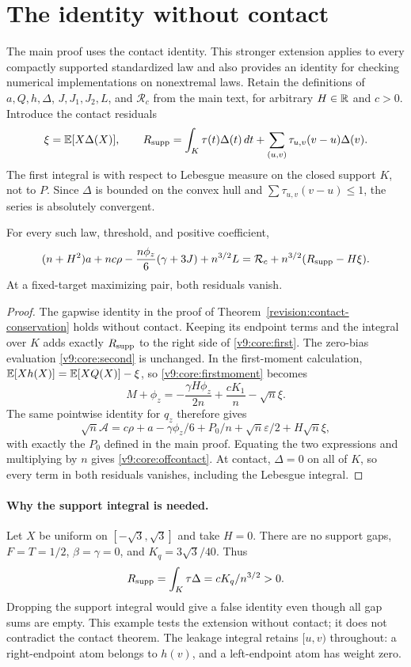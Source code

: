\section{The identity without contact}\label{revision:offcontact}
The main proof uses the contact identity. This stronger extension
applies to every compactly supported standardized law and also provides
an identity for checking numerical implementations on nonextremal laws. Retain the definitions of $a,Q,h,\Delta$,
$J,J_1,J_2,L$, and $\mathcal R_c$ from the main text, for arbitrary
$H\in\mathbb R$ and $c>0$. Introduce the contact residuals
\begin{equation}\label{v9:core:residuals}
 \xi=\mathbb E[X\Delta(X)],\qquad
 R_{\rm supp}=\int_K\tau(t)\Delta(t)\,dt
       +\sum_{(u,v)}\tau_{u,v}(v-u)\Delta(v).
\end{equation}
The first integral is with respect to Lebesgue measure on the closed
support $K$, not to $P$. Since $\Delta$ is bounded on the convex hull
and $\sum\tau_{u,v}(v-u)\le1$, the series is absolutely convergent.

\begin{theorem}\label{v9:core:general}
For every such law, threshold, and positive coefficient,
\begin{equation}\label{v9:core:offcontact}
 (n+H^2)a+nc\rho-\frac{n\phi_z}{6}(\gamma+3J)+n^{3/2}L
 =\mathcal R_c+n^{3/2}(R_{\rm supp}-H\xi).
\end{equation}
At a fixed-target maximizing pair, both residuals vanish.
\end{theorem}
\begin{proof}
The gapwise identity in the proof of
Theorem~\ref{revision:contact-conservation} holds without contact.
Keeping its endpoint terms and the integral over $K$ adds exactly
$R_{\rm supp}$ to the right side of \eqref{v9:core:first}.
The zero-bias evaluation \eqref{v9:core:second} is unchanged. In the
first-moment calculation, $\mathbb E[Xh(X)]=\mathbb E[XQ(X)]-\xi$, so
\eqref{v9:core:firstmoment} becomes
\[
 M+\phi_z=-\frac{\gamma H\phi_z}{2n}+\frac{cK_1}{n}-\sqrt n\xi.
\]
The same pointwise identity for $q_z$ therefore gives
\[
 \sqrt n\mathcal A=c\rho+a-\gamma\phi_z/6+P_0/n
                    +\sqrt n\varepsilon/2+H\sqrt n\xi,
\]
with exactly the $P_0$ defined in the main proof. Equating the two
expressions and multiplying by $n$ gives
\eqref{v9:core:offcontact}. At contact, $\Delta=0$ on all of $K$,
so every term in both residuals vanishes, including the Lebesgue integral.
\end{proof}

\paragraph{Why the support integral is needed.}
Let $X$ be uniform on $[-\sqrt3,\sqrt3]$ and take $H=0$.
There are no support gaps, $F=T=1/2$, $\beta=\gamma=0$, and
$K_q=3\sqrt3/40$. Thus
\[
 R_{\rm supp}=\int_K\tau\Delta=cK_q/n^{3/2}>0.
\]
Dropping the support integral would give a false identity even though
all gap sums are empty. This example tests the extension without
contact; it does not contradict the contact theorem. The leakage
integral retains $[u,v)$ throughout: a right-endpoint atom belongs to
$h(v)$, and a left-endpoint atom has weight zero.
